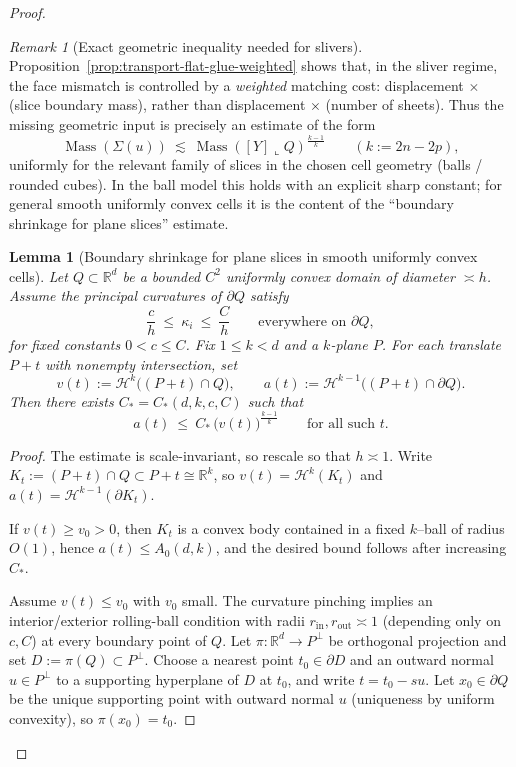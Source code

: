 \documentclass[11pt]{article}
\numberwithin{equation}{section}  %
\theoremstyle{plain}
\newtheorem{lemma}[theorem]{Lemma}
\theoremstyle{definition}
\theoremstyle{remark}
\newtheorem{remark}[theorem]{Remark}
\newcommand{\R}{\mathbb{R}}
\DeclareMathOperator{\Mass}{Mass}
\begin{document}
\begin{proof}
\begin{remark}[Exact geometric inequality needed for slivers]
Proposition~\ref{prop:transport-flat-glue-weighted} shows that, in the sliver regime, the face mismatch is controlled by a \emph{weighted} matching cost:
displacement $\times$ (slice boundary mass), rather than displacement $\times$ (number of sheets).
Thus the missing geometric input is precisely an estimate of the form
\[
\Mass(\Sigma(u))\ \lesssim\ \Mass([Y]\llcorner Q)^{\frac{k-1}{k}}
\qquad (k:=2n-2p),
\]
uniformly for the relevant family of slices in the chosen cell geometry (balls / rounded cubes).  In the ball model this holds with an explicit sharp constant;
for general smooth uniformly convex cells it is the content of the ``boundary shrinkage for plane slices'' estimate.
\end{remark}



\begin{lemma}[Boundary shrinkage for plane slices in smooth uniformly convex cells]\label{lem:uniformly-convex-slice-boundary}
Let $Q\subset\R^d$ be a bounded $C^2$ \emph{uniformly convex} domain of diameter $\asymp h$.
Assume the principal curvatures of $\partial Q$ satisfy
\[
\frac{c}{h}\ \le\ \kappa_i\ \le\ \frac{C}{h}
\qquad\text{everywhere on }\partial Q,
\]
for fixed constants $0<c\le C$.
Fix $1\le k<d$ and a $k$-plane $P$.
For each translate $P+t$ with nonempty intersection, set
\[
v(t):=\mathcal H^{k}\bigl((P+t)\cap Q\bigr),
\qquad
a(t):=\mathcal H^{k-1}\bigl((P+t)\cap \partial Q\bigr).
\]
Then there exists $C_*=C_*(d,k,c,C)$ such that
\[
a(t)\ \le\ C_*\,\bigl(v(t)\bigr)^{\frac{k-1}{k}}
\qquad\text{for all such }t.
\]
\end{lemma}

\begin{proof}
The estimate is scale-invariant, so rescale so that $h\asymp 1$.
Write $K_t:=(P+t)\cap Q\subset P+t\cong\R^k$, so $v(t)=\mathcal H^k(K_t)$ and $a(t)=\mathcal H^{k-1}(\partial K_t)$.

If $v(t)\ge v_0>0$, then $K_t$ is a convex body contained in a fixed $k$--ball of radius $O(1)$, hence $a(t)\le A_0(d,k)$, and the desired bound follows
after increasing $C_*$.

Assume $v(t)\le v_0$ with $v_0$ small.  The curvature pinching implies an interior/exterior rolling-ball condition with radii
$r_{\mathrm{in}},r_{\mathrm{out}}\asymp 1$ (depending only on $c,C$) at every boundary point of $Q$.
Let $\pi:\R^d\to P^\perp$ be orthogonal projection and set $D:=\pi(Q)\subset P^\perp$.
Choose a nearest point $t_0\in\partial D$ and an outward normal $u\in P^\perp$ to a supporting hyperplane of $D$ at $t_0$, and write $t=t_0-s u$.
Let $x_0\in\partial Q$ be the unique supporting point with outward normal $u$ (uniqueness by uniform convexity), so $\pi(x_0)=t_0$.


\end{proof}
\end{proof}
\end{document}
